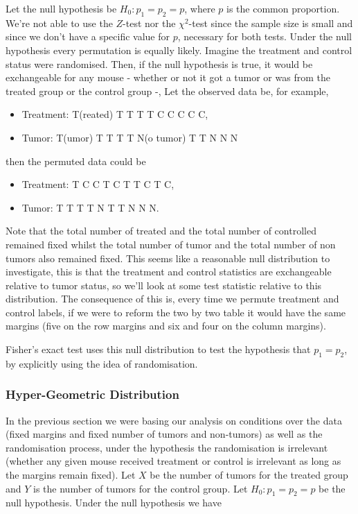 \documentclass{homework}
\begin{document}
Let the null hypothesis be $H_0 : p_1 = p_2 = p$, where $p$ is the common proportion. We're not able to use the $Z$-test nor the $\chi^2$-test since the sample size is small and since we don't have a specific value for $p$, necessary for both tests. Under the null hypothesis every permutation is equally likely. Imagine the treatment and control status were randomised. Then, if the null hypothesis is true, it would be exchangeable for any mouse - whether or not it got a tumor or was from the treated group or the control group -, Let the observed data be, for example,

\begin{itemize}
    \item Treatment: T(reated) T T T T C C C C C, \\
    \item Tumor: T(umor) T T T T N(o tumor) T T N N N 
\end{itemize}

then the permuted data could be 

\begin{itemize}
    \item Treatment: T C C T C T T C T C, \\
    \item Tumor: T T T T N T T N N N.
\end{itemize}

Note that the total number of treated and the total number of controlled remained fixed whilst the total number of tumor and the total number of non tumors also remained fixed. This seems like a reasonable null distribution to investigate, this is that the treatment and control statistics are exchangeable relative to tumor status, so we'll look at some test statistic relative to this distribution. The consequence of this is, every time we permute treatment and control labels, if we were to reform the two by two table it would have the same margins (five on the row margins and six and four on the column margins).

Fisher's exact test uses this null distribution to test the hypothesis that $p_1 = p_2$, by explicitly using the idea of randomisation. 

\clearpage

\subsubsection{Hyper-Geometric Distribution}

In the previous section we were basing our analysis on conditions over the data (fixed margins and fixed number of tumors and non-tumors) as well as the randomisation process, under the hypothesis the randomisation is irrelevant (whether any given mouse received treatment or control is irrelevant as long as the margins remain fixed). Let $X$ be the number of tumors for the treated group and $Y$ is the number of tumors for the control group. Let $H_0 : p_1 = p_2 = p$ be the null hypothesis. Under the null hypothesis we have
\end{document}
